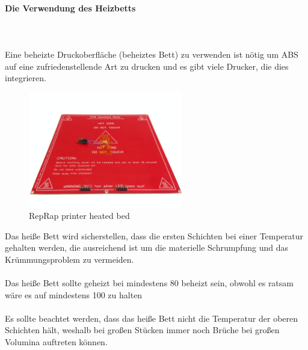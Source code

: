 \documentclass[11pt,a4paper]{article}
\begin{document}
			\paragraph{Die Verwendung des Heizbetts}\mbox{}\\\\
Eine beheizte Druckoberfläche (beheiztes Bett) zu verwenden ist nötig um ABS auf eine zufriedenstellende Art zu drucken und es gibt viele Drucker, die dies integrieren. 
\begin{figure}[H]
\centering
\includegraphics[width=0.6\textwidth,cfbox=azul_marcos 4pt 0pt]{FOTOS/HEATEDBED}
\caption*{RepRap printer heated bed}
\end{figure}
Das heiße Bett wird sicherstellen, dass die ersten Schichten bei einer Temperatur gehalten werden, die ausreichend ist um die materielle Schrumpfung und das Krümmungsproblem zu vermeiden.
\\\\
Das heiße Bett sollte geheizt bei mindestens 80 beheizt sein, obwohl es ratsam wäre es auf mindestens 100 zu halten
\\\\
Es sollte beachtet werden, dass das heiße Bett nicht die Temperatur der oberen Schichten hält, weshalb bei großen Stücken immer noch Brüche bei großen Volumina auftreten können.
\end{document}

